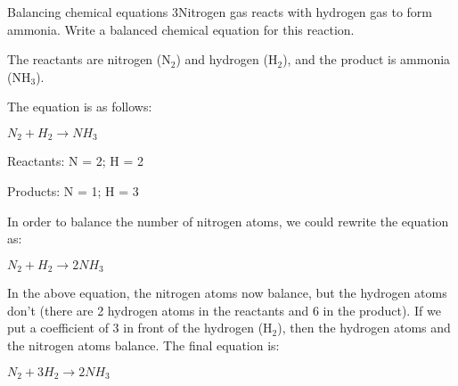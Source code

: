 \begin{wex}{Balancing chemical equations 3}{Nitrogen gas reacts with hydrogen gas to form ammonia. Write a balanced chemical equation for this reaction.\\}

{}

The reactants are nitrogen (N$_{2}$) and hydrogen (H$_{2}$), and the product is ammonia (NH$_{3}$).\\

{

The equation is as follows:

\begin{center}
\rm${N_{2} + H_{2} \rightarrow NH_{3}}$\\
\end{center}
}
{

Reactants: N = 2; H = 2

Products: N = 1; H = 3\\
}
{
In order to balance the number of nitrogen atoms, we could rewrite the equation as:

\begin{center}
\rm${N_{2} + H_{2} \rightarrow 2NH_{3}}$\\
\end{center}
}

{

In the above equation, the nitrogen atoms now balance, but the hydrogen atoms don't (there are 2 hydrogen atoms in the reactants and 6 in the product). If we put a coefficient of 3 in front of the hydrogen (H$_{2}$), then the hydrogen atoms and the nitrogen atoms balance. The final equation is:

\begin{center}
\rm${N_{2} + 3H_{2} \rightarrow 2NH_{3}}$\\
\end{center}
}
\end{wex}

